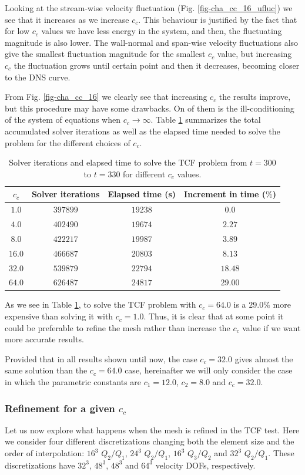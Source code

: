 Looking at the stream-wise velocity fluctuation (Fig. \ref{fig-cha_cc_16_ufluc}) we see that it increases as we increase $c_c$. This behaviour is justified by the fact that for low $c_c$ values we have less energy in the system, and then, the fluctuating magnitude is also lower. The wall-normal and span-wise velocity fluctuations also give the smallest fluctuation magnitude for the smallest $c_c$ value, but increasing $c_c$ the fluctuation grows until certain point and then it decreases, becoming closer to the DNS curve.

From Fig. \ref{fig-cha_cc_16} we clearly see that increasing $c_c$ the results improve, but this procedure may have some drawbacks. On of them is the ill-conditioning of the system of equations when $c_c\rightarrow\infty$. Table \ref{tab-cha_cc_16} summarizes the total accumulated solver iterations as well as the elapsed time needed to solve the problem for the different choices of $c_c$.
\begin{table}[h]
\caption{Solver iterations and elapsed time to solve the TCF problem from $t=300$ to $t=330$ for different $c_c$ values.}
\label{tab-cha_cc_16}
\centering
\begin{tabular}{cccc}
\toprule
$c_c$&Solver iterations&Elapsed time (s)&Increment in time ($\%$)\\
\midrule
\midrule
$1.0$&$397899$&$19238$&$0.0$\\
$4.0$&$402490$&$19674$&$2.27$\\
$8.0$&$422217$&$19987$&$3.89$\\
$16.0$&$466687$&$20803$&$8.13$\\
$32.0$&$539879$&$22794$&$18.48$\\
$64.0$&$626487$&$24817$&$29.00$\\
\bottomrule
\end{tabular}
\end{table}
As we see in Table \ref{tab-cha_cc_16}, to solve the TCF problem with $c_c=64.0$ is a $29.0\%$ more expensive than solving it with $c_c=1.0$. Thus, it is clear that at some point it could be preferable to refine the mesh rather than increase the $c_c$ value if we want more accurate results. 

Provided that in all results shown until now, the case $c_c=32.0$ gives almost the same solution than the $c_c=64.0$ case, hereinafter we will only consider the case in which the parametric constants are $c_1=12.0$, $c_2=8.0$ and $c_c=32.0$.

\subsubsection{Refinement for a given $c_c$}
Let us now explore what happens when the mesh is refined in the TCF test. Here we consider four different discretizations changing both the element size and the order of interpolation: $16^3$ $Q_2/Q_1$, $24^3$ $Q_2/Q_1$, $16^3$ $Q_3/Q_2$ and $32^3$ $Q_2/Q_1$. These discretizations have $32^3$, $48^3$, $48^3$ and $64^3$ velocity DOFs, respectively.

